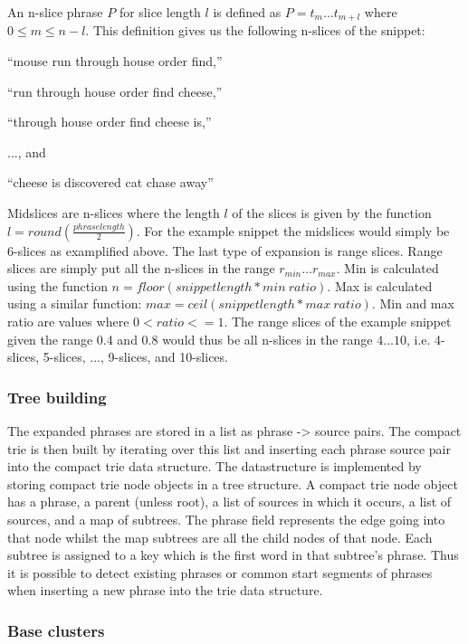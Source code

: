 An n-slice phrase \(P\) for slice length \(l\) is defined as \(P = t_{m} \dots t_{m+l}\) where \(0 \le m \le n - l\). This definition gives us the following n-slices of the snippet:
\begin{inparaenum}[\itshape 1\upshape)]
\item ``mouse run through house order find,''
\item ``run through house order find cheese,''
\item ``through house order find cheese is,''
\item ..., and
\item ``cheese is discovered cat chase away''
\end{inparaenum}

Midslices are n-slices where the length \(l\) of the slices is given by the function \(l = round(\frac{phraselength}{2})\). For the example snippet the midslices would simply be 6-slices as examplified above. The last type of expansion is range slices. Range slices are simply put all the n-slices in the range \(r_{min} \dots r_{max}\). Min is calculated using the function \(n = floor(snippet length * min~ratio)\). Max is calculated using a similar function: \(max = ceil(snippet length * max~ratio)\).  Min and max ratio are values where \(0 < ratio <= 1\). The range slices of the example snippet given the range 0.4 and 0.8 would thus be all n-slices in the range \(4 \dots 10\), i.e. 4-slices, 5-slices, ..., 9-slices, and 10-slices.

\subsubsection{Tree building}
The expanded phrases are stored in a list as phrase -> source pairs. The compact trie is then built by iterating over this list and inserting each phrase source pair into the compact trie data structure. The datastructure is implemented by storing compact trie node objects in a tree structure. A compact trie node object has a phrase, a parent (unless root), a list of sources in which it occurs, a list of sources, and a map  of subtrees. The phrase field represents the edge going into that node whilst the map subtrees are all the child nodes of that node. Each subtree is assigned to a key which is the first word in that subtree's phrase. Thus it is possible to detect existing phrases or common start segments of phrases when inserting a new phrase into the trie data structure.

\subsubsection{Base clusters}

